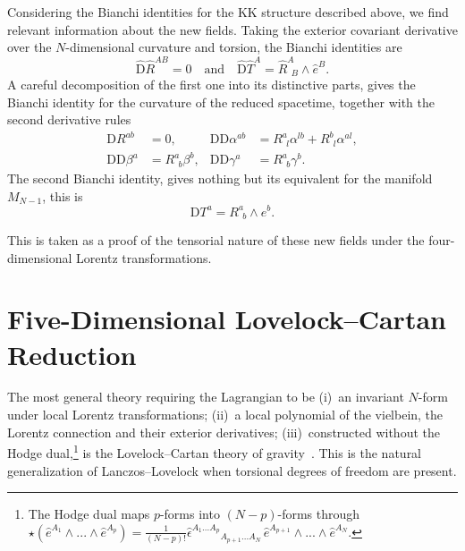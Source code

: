 \documentclass[aps,prd,12pt,superscriptaddress,showpacs,showkeys,longbibliography,reprint,nofootinbib]{revtex4-1}
\begin{document}
Considering the Bianchi identities for the KK structure described above, we find relevant information about the new fields. Taking the exterior covariant derivative over the $N$-dimensional curvature and torsion, the Bianchi identities are
\begin{equation}
  \hat{\text{D}}\hat{R}^{AB} = 0 \quad \text{and} \quad \hat{\text{D}}\hat{T}^A = \hat{R}^A_{\ \ B}\wedge\hat{e}^B.
\end{equation}
A careful decomposition of the first one into its distinctive parts, gives the Bianchi identity for the curvature of the reduced spacetime, together with the second derivative rules
\begin{equation}
  \begin{aligned}
    \text{D}R^{ab} &=0, & \text{D}\mbox{D}\alpha^{ab} &=R^a_{\ \ l}\alpha^{lb}+R^b_{\ \ l}\alpha^{al},\\
    \text{D}\text{D}\beta^a &= R^a_{\ \ b}\beta^{b}, & \text{D}\text{D}\gamma^a &= R^a_{\ \ b}\gamma^{b}.
  \end{aligned}
\end{equation}
The second Bianchi identity, gives nothing but its equivalent for the manifold $M_{N-1}$, this is
\begin{equation*}
  \mbox{D}T^a=R^a_{\ \ b}\wedge e^b.
\end{equation*}

This is taken as a proof of the tensorial nature of these new fields under the four-dimensional Lorentz transformations.

\section{Five-Dimensional Lovelock--Cartan Reduction\label{5EGB}}

The most general theory requiring the Lagrangian to be (i)~an invariant $N$-form under local Lorentz transformations; (ii)~a local polynomial of the vielbein, the Lorentz connection and their exterior derivatives; (iii)~constructed without the Hodge dual,\footnote{The Hodge dual maps $p$-forms into $(N-p)$-forms through $\star\left(\hat{e}^{A_1}\wedge ... \wedge\hat{e}^{A_p}\right) = \frac{1}{(N-p)!}\hat{\epsilon}^{A_1\ldots A_p}{}_{A_{p+1}...A_N}\,\hat{e}^{A_{p+1}}\wedge ... \wedge\hat{e}^{A_N}$.} is the Lovelock--Cartan theory of gravity~\cite{Mardones:1990qc}. This is the natural generalization of Lanczos--Lovelock when torsional degrees of freedom are present. 
\end{document}
